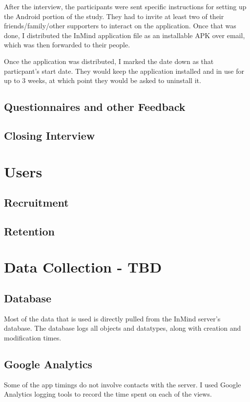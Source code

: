   After the interview, the participants were sent specific instructions
  for setting up the Android portion of the study.
  They had to invite at least two of their friends/family/other supporters
  to interact on the application.
  Once that was done, I distributed the InMind application file as
  an installable APK over email, which was then forwarded to their people.

  Once the application was distributed,
  I marked the date down as that particpant's start date.
  They would keep the application installed and in use for up to 3 weeks,
  at which point they would be asked to uninstall it.

  \subsection{Questionnaires and other Feedback}

  \subsection{Closing Interview}

\section{Users}

  \subsection{Recruitment}

  \subsection{Retention}

\section{Data Collection - TBD}
  \subsection{Database}
    Most of the data that is used is directly pulled from
    the InMind server's database.
    The database logs all objects and datatypes,
    along with creation and modification times.

  \subsection{Google Analytics}
    Some of the app timings do not involve contacts with the server.
    I used Google Analytics logging tools to record the time spent
    on each of the views.

